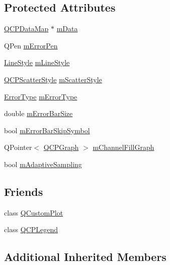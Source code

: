 \subsection*{Protected Attributes}
\begin{DoxyCompactItemize}
\item 
\hyperlink{qcustomplot_8h_a84a9c4a4c2216ccfdcb5f3067cda76e3}{Q\+C\+P\+Data\+Map} $\ast$ \hyperlink{classQCPGraph_a8457c840f69a0ac49f61d30a509c5d08}{m\+Data}
\item 
Q\+Pen \hyperlink{classQCPGraph_aa35681a24165c2831301091a87b662ce}{m\+Error\+Pen}
\item 
\hyperlink{classQCPGraph_ad60175cd9b5cac937c5ee685c32c0859}{Line\+Style} \hyperlink{classQCPGraph_a8604fd98402035a63375849f7341ee25}{m\+Line\+Style}
\item 
\hyperlink{classQCPScatterStyle}{Q\+C\+P\+Scatter\+Style} \hyperlink{classQCPGraph_a4aa36241f166ccd1f75fc8f24e4a3247}{m\+Scatter\+Style}
\item 
\hyperlink{classQCPGraph_ad23b514404bd2cb3216f57c90904d6af}{Error\+Type} \hyperlink{classQCPGraph_a29e64273db201aeadebc61c870720a36}{m\+Error\+Type}
\item 
double \hyperlink{classQCPGraph_a7b51c8d09510f9d195b5e765ccbcf05b}{m\+Error\+Bar\+Size}
\item 
bool \hyperlink{classQCPGraph_acf631d7dbd1055a69ab3b63094868557}{m\+Error\+Bar\+Skip\+Symbol}
\item 
Q\+Pointer$<$ \hyperlink{classQCPGraph}{Q\+C\+P\+Graph} $>$ \hyperlink{classQCPGraph_a2f1777c7accf8244fc640c33f0b04577}{m\+Channel\+Fill\+Graph}
\item 
bool \hyperlink{classQCPGraph_aa951e78aeba714cf443be6da2e52502e}{m\+Adaptive\+Sampling}
\end{DoxyCompactItemize}
\subsection*{Friends}
\begin{DoxyCompactItemize}
\item 
class \hyperlink{classQCPGraph_a1cdf9df76adcfae45261690aa0ca2198}{Q\+Custom\+Plot}
\item 
class \hyperlink{classQCPGraph_a8429035e7adfbd7f05805a6530ad5e3b}{Q\+C\+P\+Legend}
\end{DoxyCompactItemize}
\subsection*{Additional Inherited Members}


